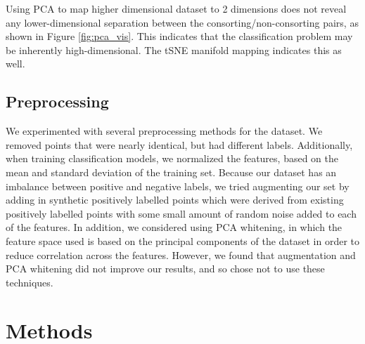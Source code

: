 \documentclass[twoside,twocolumn,paper=letter,fontsize=11pt]{article}
\begin{document}
Using PCA to map higher dimensional dataset to 2 dimensions does not reveal
any lower-dimensional separation between the consorting/non-consorting pairs, as
shown in Figure \ref{fig:pca_vis}.
This indicates that the classification problem may be inherently
high-dimensional. The tSNE manifold mapping indicates this as well.

\subsection{Preprocessing}

We experimented with several preprocessing methods for the dataset. We removed
points that were nearly identical, but had different labels. Additionally, when
training classification models, we normalized the features, based on the mean
and standard deviation of the training set. Because our dataset has an imbalance
between positive and negative labels, we tried augmenting our set by adding in
synthetic positively labelled points which were derived from existing positively
labelled points with some small amount of random noise added to each of the
features. In addition, we considered using PCA whitening, in which the feature
space used is based on the principal components of the dataset in order to
reduce correlation across the features. However, we found that augmentation and
PCA whitening did not improve our results, and so chose not to use these
techniques.

\section{Methods}

\end{document}
